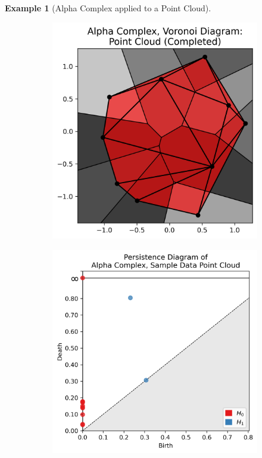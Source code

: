 \documentclass[ma]{uncgdissertationexp}
\theoremstyle{plain}
\theoremstyle{definition}
\newtheorem{example}[theorem]{Example}
\theoremstyle{remark}
\begin{document}
\begin{example}[Alpha Complex applied to a Point Cloud]
\begin{figure}[H]
\begin{subfigure}[b]{0.26\textwidth}
    \end{subfigure}
    \begin{subfigure}[b]{0.26\textwidth}
        \includegraphics[width=\textwidth]{point_cloud_plot_alpha_voronoi.png}
    \end{subfigure}
    \begin{subfigure}[b]{0.26\textwidth}
        \includegraphics[width=\textwidth]{point_cloud_persdia_alpha_voronoi.png}
    \end{subfigure}


\end{figure}
\end{example}
\end{document}
